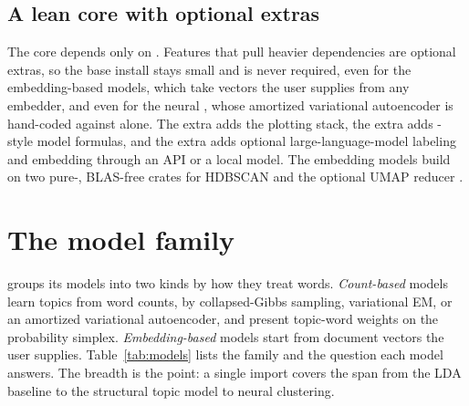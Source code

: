 \documentclass[article,nojss]{jss}
\begin{document}
\subsection{A lean core with optional extras}

The core depends only on . Features that pull heavier dependencies are
optional extras, so the base install stays small and  is never
required, even for the embedding-based models, which take vectors the user
supplies from any embedder, and even for the neural , whose
amortized variational autoencoder is hand-coded against  alone. The  extra adds the plotting stack, the
 extra adds -style model formulas, and the 
extra adds optional large-language-model labeling and embedding through an API or
a local model. The embedding models build on two pure-,
BLAS-free crates for HDBSCAN \citep{campello2013hdbscan} and the optional UMAP
reducer \citep{mcinnes2018umap}.

\section{The model family}\label{sec:models}

 groups its models into two kinds by how they treat words.
\emph{Count-based} models learn topics from word counts, by collapsed-Gibbs
sampling, variational EM, or an amortized variational autoencoder, and present
topic-word weights on the probability simplex. \emph{Embedding-based} models
start from document vectors the user supplies. Table~\ref{tab:models} lists the family and the question each model
answers. The breadth is the point: a single import covers the span from the LDA
baseline to the structural topic model to neural clustering.
\end{document}
